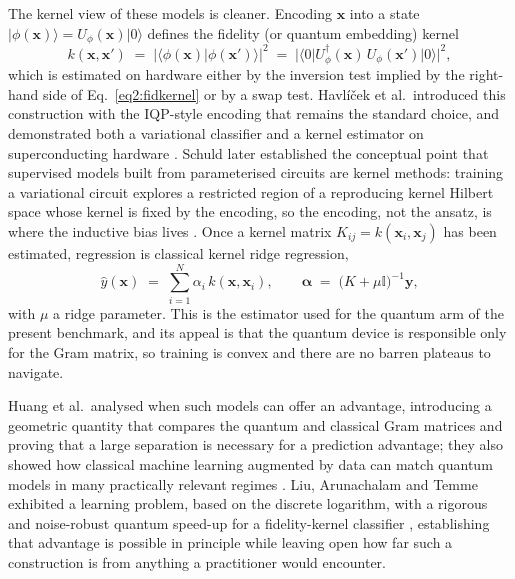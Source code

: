 \documentclass[Thesis.tex]{subfiles}
\begin{document}
The kernel view of these models is cleaner. Encoding $\mathbf{x}$ into a state
$\lvert \phi(\mathbf{x})\rangle = U_{\phi}(\mathbf{x})\lvert 0\rangle$ defines
the fidelity (or quantum embedding) kernel
\begin{equation}
  k(\mathbf{x},\mathbf{x}') \;=\; \bigl\lvert \langle \phi(\mathbf{x}) \vert \phi(\mathbf{x}')\rangle \bigr\rvert^{2}
  \;=\; \bigl\lvert \langle 0 \rvert U_{\phi}^{\dagger}(\mathbf{x})\,U_{\phi}(\mathbf{x}')\lvert 0\rangle \bigr\rvert^{2},
  \label{eq2:fidkernel}
\end{equation}
which is estimated on hardware either by the inversion test implied by the
right-hand side of Eq.~\eqref{eq2:fidkernel} or by a swap test. Havl\'i\v{c}ek
et al.\ introduced this construction with the IQP-style encoding that remains
the standard choice, and demonstrated both a variational classifier and a
kernel estimator on superconducting hardware \cite{havlicek2019supervised}.
Schuld later established the conceptual point that supervised models built from
parameterised circuits are kernel methods: training a variational circuit
explores a restricted region of a reproducing kernel Hilbert space whose kernel
is fixed by the encoding, so the encoding, not the ansatz, is where the
inductive bias lives \cite{schuld2021kernel}. Once a kernel matrix
$K_{ij} = k(\mathbf{x}_{i},\mathbf{x}_{j})$ has been estimated, regression is
classical kernel ridge regression,
\begin{equation}
  \widehat{y}(\mathbf{x}) \;=\; \sum_{i=1}^{N} \alpha_{i}\, k(\mathbf{x},\mathbf{x}_{i}),
  \qquad
  \boldsymbol{\alpha} \;=\; \bigl(K + \mu \mathbb{I}\bigr)^{-1}\mathbf{y},
  \label{eq2:krr}
\end{equation}
with $\mu$ a ridge parameter. This is the estimator used for the quantum arm
of the present benchmark, and its appeal is that the quantum device is
responsible only for the Gram matrix, so training is convex and there are no
barren plateaus to navigate.

Huang et al.\ analysed when such models can offer an advantage, introducing a
geometric quantity that compares the quantum and classical Gram matrices and
proving that a large separation is necessary for a prediction advantage; they
also showed how classical machine learning augmented by data can match quantum
models in many practically relevant regimes \cite{huang2021power}. Liu,
Arunachalam and Temme exhibited a learning problem, based on the discrete
logarithm, with a rigorous and noise-robust quantum speed-up for a
fidelity-kernel classifier \cite{liu2021rigorous}, establishing that advantage
is possible in principle while leaving open how far such a construction is
from anything a practitioner would encounter.
\end{document}
